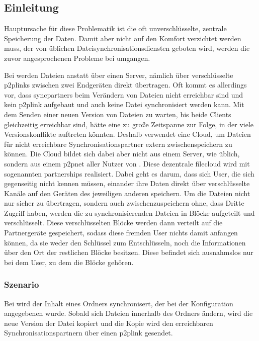 
\subsection{Einleitung}
Hauptursache für diese Problematik ist die oft unverschlüsselte, zentrale
Speicherung der Daten. Damit aber nicht auf den Komfort verzichtet werden muss,
der von üblichen Dateisynchronisationsdiensten geboten wird, werden die zuvor angesprochenen
Probleme bei \sblit umgangen.

Bei \sblit werden Dateien anstatt über einen Server, nämlich über verschlüsselte
\glspl{p2plink} zwischen zwei Endgeräten direkt übertragen.
Oft kommt es allerdings vor, dass \glspl{syncpartner} beim Verändern von
Dateien nicht erreichbar sind und kein \gls{p2plink} aufgebaut und auch
keine Datei synchronisiert werden kann.
Mit dem Senden einer neuen Version von Dateien zu warten,
bis beide Clients gleichzeitig erreichbar sind, hätte eine zu große Zeitspanne
zur Folge, in der viele Versionskonflikte auftreten könnten.
Deshalb verwendet \sblit eine Cloud, um Dateien für nicht erreichbare
Synchronisationspartner extern zwischenspeichern zu können. Die Cloud bildet
sich dabei aber nicht aus einem Server, wie üblich, sondern aus einem \gls{p2pnet}
aller Nutzer von \sblit. Diese dezentrale \gls{filecloud} wird
mit sogenannten \glspl{partnership} realisiert. Dabei geht es darum, dass sich
User, die sich gegenseitig nicht kennen müssen, einander ihre Daten direkt über
verschlüsselte Kanäle auf den Geräten des jeweiligen anderen speichern.
Um die Dateien nicht nur sicher zu übertragen, sondern auch zwischenzuspeichern
ohne, dass Dritte Zugriff haben, werden die zu
synchronisierenden Dateien in Blöcke aufgeteilt und verschlüsselt. Diese
verschlüsselten Blöcke werden dann verteilt auf die Partnergeräte gespeichert,
sodass diese fremden User nichts damit anfangen können, da sie weder den
Schlüssel zum Entschlüsseln, noch die Informationen über den Ort der restlichen
Blöcke besitzen. Diese befindet sich ausnahmslos nur bei dem User, zu dem die
Blöcke gehören.

\subsubsection{Szenario}
Bei \sblit wird der Inhalt eines Ordners synchronisert, der bei der
Konfiguration angegebenen wurde. Sobald sich Dateien innerhalb des Ordners
ändern, wird die neue Version der Datei kopiert und die Kopie wird den
erreichbaren Synchronisationspartnern über einen \gls{p2plink}
gesendet.


